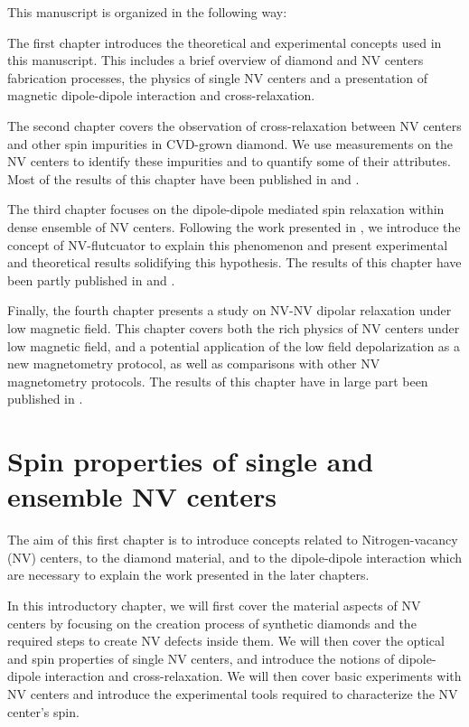 \documentclass[a4paper, 11pt]{report}
\begin{document}
\bigskip
This manuscript is organized in the following way:

\medskip
The first chapter introduces the theoretical and experimental concepts used in this manuscript. This includes a brief overview of diamond and NV centers fabrication processes, the physics of single NV centers and a presentation of magnetic dipole-dipole interaction and cross-relaxation.

The second chapter covers the observation of cross-relaxation between NV centers and other spin impurities in CVD-grown diamond. We use measurements on the NV centers to identify these impurities and to quantify some of their attributes. Most of the results of this chapter have been published in  \citep{pellet2021optical} and \citep{ngambou2022improving}.

The third chapter focuses on the dipole-dipole mediated spin relaxation within dense ensemble of NV centers. Following the work presented in \citep{choi2017depolarization}, we introduce the concept of NV-flutcuator to explain this phenomenon and present experimental and theoretical results solidifying this hypothesis. The results of this chapter have been partly published in \citep{pellet2022spin} and \citep{pellet2021magnetic}.

Finally, the fourth chapter presents a study on NV-NV dipolar relaxation under low magnetic field. This chapter covers both the rich physics of NV centers under low magnetic field, and a potential application of the low field depolarization as a new magnetometry protocol, as well as comparisons with other NV magnetometry protocols. The results of this chapter have in large part been published in \citep{pellet2022spin}.


\chapter{Spin properties of single and ensemble NV centers}
The aim of this first chapter is to introduce concepts related to Nitrogen-vacancy (NV) centers, to the diamond material, and to the dipole-dipole interaction which are necessary to explain the work presented in the later chapters.

In this introductory chapter, we will first cover the material aspects of NV centers by focusing on the creation process of synthetic diamonds and the required steps to create NV defects inside them. We will then cover the optical and spin properties of single NV centers, and introduce the notions of dipole-dipole interaction and cross-relaxation. We will then cover basic experiments with NV centers and introduce the experimental tools required to characterize the NV center's spin. 
\end{document}
